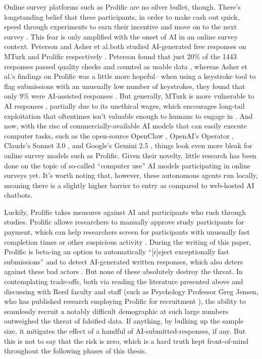\documentclass[12pt,twoside]{reedthesis}
\begin{document}
    Online survey platforms such as Prolific are no silver bullet, though. There's longstanding belief that these participants, in order to make cash out quick, speed through experiments to earn their incentive and move on to the next survey \cite{palan_prolificacsubject_2018}. This fear is only amplified with the onset of AI in an online survey context. Peterson and Asher et al.\@ both studied AI-generated free responses on MTurk and Prolific respectively \cite{peterson_impact_nodate, asher_chatbots_2025}. Peterson found that just 20\% of the 1443 responses passed quality checks and counted as usable data \cite{peterson_impact_nodate}, whereas Asher et al.'s findings on Prolific was a little more hopeful-- when using a keystroke tool to flag submissions with an unusually low number of keystrokes, they found that only 9\% were AI-assisted responses \cite{asher_chatbots_2025}. But generally, MTurk is more vulnerable to AI responses \cite{christoforou_generative_2024}, partially due to its unethical wages, which encourages long-tail exploitation that oftentimes isn't valuable enough to humans to engage in \cite{carlini_llms_2025}. And now, with the rise of commercially-available AI models that can easily execute computer tasks, such as the open-source OpenClaw \cite{openclaw}, OpenAI's Operator \cite{openai_operator}, Claude's Sonnet 3.0 \cite{claude_sonnet}, and Google's Gemini 2.5 \cite{google_gemini}, things look even more bleak for online survey models such as Prolific. Given their novelty, little research has been done on the topic of so-called \enquote{computer use} AI models participating in online surveys yet. It's worth noting that, however, these autonomous agents run locally, meaning there is a slightly higher barrier to entry as compared to web-hosted AI chatbots.

    Luckily, Prolific takes measures against AI and participants who rush through studies. Prolific allows researchers to manually approve study participants for payment, which can help researchers screen for participants with unusually fast completion times or other suspicious activity \cite{prolific_home}. During the writing of this paper, Prolific is beta-ing an option to automatically \enquote{[r]eject exceptionally fast submissions} and to detect AI-generated written responses, which also deters against these bad actors \cite{prolific_home}. But none of these absolutely destroy the threat. In contemplating trade-offs, both via reading the literature presented above and discussing with Reed faculty and staff (such as Psychology Professor Greg Jensen, who has published research employing Prolific for recruitment \cite{jensen_does_2022}), the ability to seamlessly recruit a notably difficult demographic at such large numbers outweighed the threat of falsified data. If anything, by bulking up the sample size, it mitigates the effect of a handful of AI-submitted-responses, if any. But this is not to say that the risk is zero, which is a hard truth kept front-of-mind throughout the following phases of this thesis. 
\end{document}
